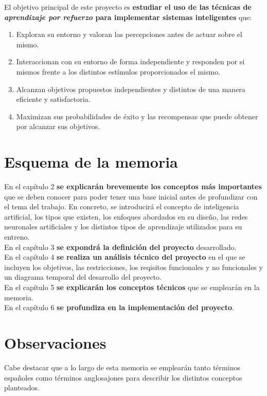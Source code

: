 El objetivo principal de este proyecto es \textbf{estudiar el uso de las técnicas de \textit{aprendizaje por refuerzo} para implementar sistemas inteligentes} que: 
\begin{enumerate}
    \item Exploran su entorno y valoran las percepciones antes de actuar sobre el mismo.
    \item Interaccionan con su entorno de forma independiente y responden por si mismos frente a los distintos estímulos proporcionados el mismo.
    \item Alcanzan objetivos propuestos independientes y distintos de una manera eficiente y satisfactoria.
    \item Maximizan sus probabilidades de éxito y las recompensas que puede obtener por alcanzar sus objetivos. 
\end{enumerate}

\section{Esquema de la memoria}

En el capítulo 2 \textbf{se explicarán brevemente los conceptos más importantes} que se deben conocer para poder tener una base inicial antes de profundizar con el tema del trabajo. En concreto, se introducirá el concepto de inteligencia artificial, los tipos que existen, los enfoques abordados en su diseño, las redes neuronales artificiales y los distintos tipos de aprendizaje utilizados para su entreno. \\

En el capítulo 3 \textbf{se expondrá la definición del proyecto} desarrollado. \\

En el capítulo 4 \textbf{se realiza un análisis técnico del proyecto} en el que se incluyen los objetivos, las restricciones, los reqisitos funcionales y no funcionales y un diagrama temporal del desarrollo del proyecto. \\

En el capítulo 5 \textbf{se explicarán los conceptos técnicos} que se emplearán en la memoria. \\

En el capítulo 6 \textbf{se profundiza en la implementación del proyecto}. \\

\section{Observaciones}

Cabe destacar que a lo largo de esta memoria se emplearán tanto términos españoles como términos anglosajones para describir los distintos conceptos planteados. 
